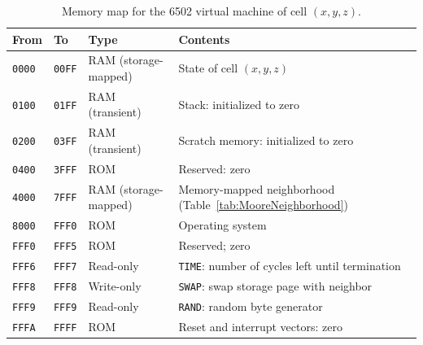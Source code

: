\documentclass{article}
\newcommand\code[1]{{\tt #1}}
\newcommand\hex[1]{{\tt #1}}
\begin{document}
\newcommand\memrow[4]{
    \hex{{#1}00} & \hex{{#1}FF} & State of cell $(x#2,y#3,z#4)$ \\
}

\newcommand\memz[5]{
  \memrow{#1}{#4}{#5}{-1}
  \memrow{#2}{#4}{#5}{}
  \memrow{#3}{#4}{#5}{+1}
}

\newcommand\memyz[2]{
  \memz{{#1}0}{{#1}1}{{#1}2}{#2}{-1}
  \memz{{#1}4}{{#1}5}{{#1}6}{#2}{}
  \memz{{#1}8}{{#1}9}{{#1}A}{#2}{+1}
}

\newcommand\memxyz{
  \memyz{4}{-1}

  \memz{50}{51}{52}{}{-1}
  \memrow{54}{}{}{-1}
  \memrow{56}{}{}{+1}
  \memz{58}{59}{5A}{}{+1}

  \memyz{6}{+1}
}

\newcommand\vonneumannmap{\memtable{
  \memrow{45}{-1}{}{}
  \memrow{51}{}{-1}{}
  \memrow{54}{}{}{-1}
  \memrow{56}{}{}{+1}
  \memrow{59}{}{+1}{}
  \memrow{65}{+1}{}{}
}}

\newcommand\mooremap{\memtable{\memxyz}}

\begin{table}
\begin{tabular}{llll}
  \hline
  From & To & Type & Contents \\
  \hline
  \hex{0000} & \hex{00FF} & RAM (storage-mapped) & State of cell $(x,y,z)$ \\
  \hex{0100} & \hex{01FF} & RAM (transient) & Stack: initialized to zero \\
  \hex{0200} & \hex{03FF} & RAM (transient) & Scratch memory: initialized to zero \\
  \hex{0400} & \hex{3FFF} & ROM & Reserved: zero \\
  \hex{4000} & \hex{7FFF} & RAM (storage-mapped) & Memory-mapped neighborhood (Table~\ref{tab:MooreNeighborhood}) \\
  \hex{8000} & \hex{FFF0} & ROM & Operating system \\
  \hex{FFF0} & \hex{FFF5} & ROM & Reserved; zero \\
  \hex{FFF6} & \hex{FFF7} & Read-only & \code{TIME}: number of cycles left until termination \\
  \hex{FFF8} & \hex{FFF8} & Write-only & \code{SWAP}: swap storage page with neighbor \\
  \hex{FFF9} & \hex{FFF9} & Read-only & \code{RAND}: random byte generator \\
  \hex{FFFA} & \hex{FFFF} & ROM & Reset and interrupt vectors: zero \\
  \hline
\end{tabular}
\caption{
  \label{tab:MemoryMap}
  Memory map for the 6502 virtual machine of cell $(x,y,z)$.
}
\end{table}
\end{document}
